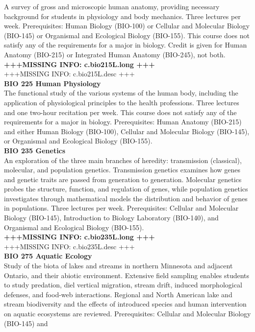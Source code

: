 \documentclass[
  letterpaper,
]{scrbook}
\begin{document}
A survey of gross and microscopic human anatomy, providing necessary
background for students in physiology and body mechanics. Three lectures
per week. Prerequisites: Human Biology (BIO-100) or Cellular and
Molecular Biology (BIO-145) or Organismal and Ecological Biology
(BIO-155). This course does not satisfy any of the requirements for a
major in biology. Credit is given for Human Anatomy (BIO-215) or
Integrated Human Anatomy (BIO-245), not both.\\
\textbf{+++MISSING INFO: c.bio215L.long +++}\\
+++MISSING INFO: c.bio215L.desc +++\\
\textbf{BIO 225 Human Physiology}\\
The functional study of the various systems of the human body, including
the application of physiological principles to the health professions.
Three lectures and one two-hour recitation per week. This course does
not satisfy any of the requirements for a major in biology.
Prerequisites: Human Anatomy (BIO-215) and either Human Biology
(BIO-100), Cellular and Molecular Biology (BIO-145), or Organismal and
Ecological Biology (BIO-155).\\
\textbf{BIO 235 Genetics}\\
An exploration of the three main branches of heredity: transmission
(classical), molecular, and population genetics. Transmission genetics
examines how genes and genetic traits are passed from generation to
generation. Molecular genetics probes the structure, function, and
regulation of genes, while population genetics investigates through
mathematical models the distribution and behavior of genes in
populations. Three lectures per week. Prerequisites: Cellular and
Molecular Biology (BIO-145), Introduction to Biology Laboratory
(BIO-140), and Organismal and Ecological Biology (BIO-155).\\
\textbf{+++MISSING INFO: c.bio235L.long +++}\\
+++MISSING INFO: c.bio235L.desc +++\\
\textbf{BIO 275 Aquatic Ecology}\\
Study of the biota of lakes and streams in northern Minnesota and
adjacent Ontario, and their abiotic environment. Extensive field
sampling enables students to study predation, diel vertical migration,
stream drift, induced morphological defenses, and food-web interactions.
Regional and North American lake and stream biodiversity and the effects
of introduced species and human intervention on aquatic ecosystems are
reviewed. Prerequisites: Cellular and Molecular Biology (BIO-145) and
\end{document}
